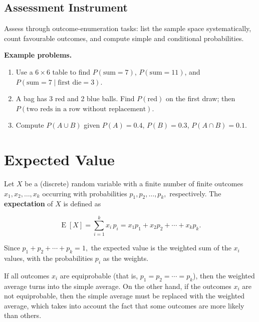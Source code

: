 \subsection{Assessment Instrument}
\label{ssec:asse-3669}


Assess through outcome-enumeration tasks: list the sample space
systematically, count favourable outcomes, and compute simple and
conditional probabilities.

\textbf{Example problems.}
\begin{enumerate}
    \item Use a $6\times6$ table to find $P(\text{sum}=7)$,
          $P(\text{sum}=11)$, and
          $P(\text{sum}=7\mid\text{first die}=3)$.
    \item A bag has 3 red and 2 blue balls. Find $P(\text{red})$ on the
          first draw; then $P(\text{two reds in a row without
          replacement})$.
    \item Compute $P(A\cup B)$ given $P(A)=0.4$, $P(B)=0.3$,
          $P(A\cap B)=0.1$.
\end{enumerate}



\section{Expected Value}
\label{sec:expe-91cd}


Let $X$ be a (discrete) random variable with a finite number of finite outcomes $x _1, x
_2, \ldots, x _k$ occurring with probabilities $p _1, p _2, \ldots, p _k,$ respectively.
The \textbf{expectation} of $X$ is defined as



$$\operatorname{E}[X] =\sum _{i=1}^k x _i\,p _i=x _1p _1 + x _2p _2 + \cdots + x _kp _k.$$



Since $p _1 + p _2 + \cdots + p _k = 1,$ the expected value is the weighted sum of the $x
_i$ values, with the probabilities $p _i$ as the weights.



If all outcomes $x _i$ are equiprobable (that is, $p _1 = p _2 = \cdots = p _k$), then the
weighted average turns into the simple average. On the other hand, if the outcomes $x _i$
are not equiprobable, then the simple average must be replaced with the weighted average,
which takes into account the fact that some outcomes are more likely than others.



